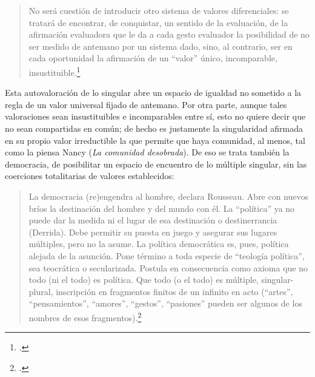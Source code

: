 \begin{quote}
No será cuestión de introducir otro sistema de valores diferenciales: se tratará de encontrar, de conquistar, un sentido de la evaluación, de la afirmación evaluadora que le da a cada gesto evaluador  la posibilidad de no ser medido de antemano por un sistema dado, sino, al contrario, ser en cada oportunidad la afirmación de un \enquote{valor}  único, incomparable, insustituible.\footcite[45]{@7012-NANCY2009}
\end{quote}


Esta autovaloración de lo singular abre un espacio de igualdad no sometido a la regla de un valor universal fijado de antemano. Por otra parte, aunque tales valoraciones sean insustituibles e incomparables entre sí, esto no quiere decir que no sean compartidas en común; de hecho es justamente la singularidad afirmada en su propio valor irreductible la que permite que haya comunidad, al menos, tal como la piensa Nancy (\emph{La comunidad desobrada}). De eso se trata también la democracia, de posibilitar un espacio de encuentro de lo múltiple singular, sin las coerciones totalitarias de valores establecidos:

\begin{quote}
La democracia (re)engendra al hombre, declara Rousseau. Abre con nuevos bríos la destinación del hombre y del mundo con él. La \enquote{política} ya no puede dar la medida ni el lugar de esa destinación o destinerrancia (Derrida). Debe permitir su puesta en juego y asegurar sus lugares múltiples, pero no la asume. La política democrática es, pues, política alejada de la asunción. Pone término a toda especie de \enquote{teología política}, sea teocrática o secularizada. Postula en consecuencia como axioma que no todo (ni el todo) es política. Que todo (o el todo) es múltiple, singular-plural, inscripción en fragmentos finitos de un infinito en acto (\enquote{artes}, \enquote{pensamientos}, \enquote{amores}, \enquote{gestos}, \enquote{pasiones} pueden ser algunos de los nombres de esos fragmentos).\footcite[57]{@7012-NANCY2009}
\end{quote}

